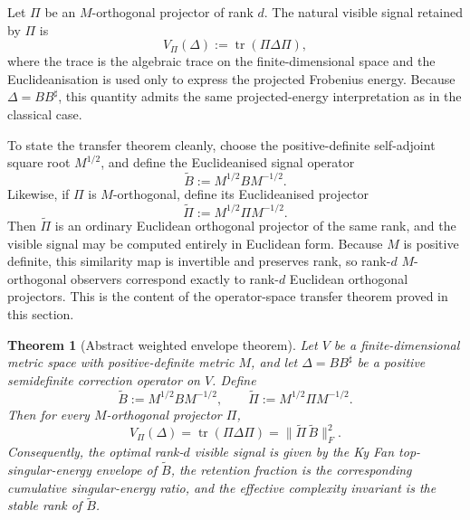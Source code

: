 \documentclass[11pt,a4paper]{article}
\numberwithin{equation}{section}
\theoremstyle{thmcompact}
\newtheorem{theorem}{Theorem}[section]
\theoremstyle{remark}
\begin{document}
Let \(\Pi\) be an \(M\)-orthogonal projector of rank \(d\). The natural visible signal retained by \(\Pi\) is
\begin{equation}
V_\Pi(\Delta):=\operatorname{tr}(\Pi\Delta\Pi),
\end{equation}
where the trace is the algebraic trace on the finite-dimensional space and the Euclideanisation is used only to express the projected Frobenius energy. Because \(\Delta=BB^{\sharp}\), this quantity admits the same projected-energy interpretation as in the classical case.

To state the transfer theorem cleanly, choose the positive-definite self-adjoint square root \(M^{1/2}\), and define the Euclideanised signal operator
\begin{equation}
\widetilde B:=M^{1/2}BM^{-1/2}.
\end{equation}
Likewise, if \(\Pi\) is \(M\)-orthogonal, define its Euclideanised projector
\begin{equation}
\widetilde\Pi:=M^{1/2}\Pi M^{-1/2}.
\end{equation}
Then \(\widetilde\Pi\) is an ordinary Euclidean orthogonal projector of the same rank, and the visible signal may be computed entirely in Euclidean form. Because \(M\) is positive definite, this similarity map is invertible and preserves rank, so rank-\(d\) \(M\)-orthogonal observers correspond exactly to rank-\(d\) Euclidean orthogonal projectors. This is the content of the operator-space transfer theorem proved in this section.

\begin{theorem}[Abstract weighted envelope theorem]
\label{thm:abstract_weighted_envelope_theorem}
Let \(V\) be a finite-dimensional metric space with positive-definite metric \(M\), and let \(\Delta=BB^{\sharp}\) be a positive semidefinite correction operator on \(V\). Define
\begin{equation}
\widetilde B:=M^{1/2}BM^{-1/2},
\qquad
\widetilde\Pi:=M^{1/2}\Pi M^{-1/2}.
\end{equation}
Then for every \(M\)-orthogonal projector \(\Pi\),
\begin{equation}
V_\Pi(\Delta)
=
\operatorname{tr}(\Pi\Delta\Pi)
=
\|\widetilde\Pi\,\widetilde B\|_F^2.
\end{equation}
Consequently, the optimal rank-\(d\) visible signal is given by the Ky Fan top-singular-energy envelope of \(\widetilde B\), the retention fraction is the corresponding cumulative singular-energy ratio, and the effective complexity invariant is the stable rank of \(\widetilde B\).
\end{theorem}
\end{document}
